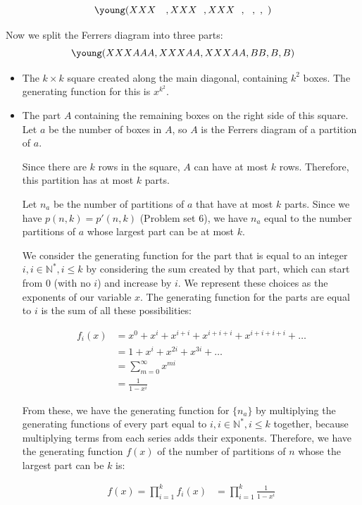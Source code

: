 \documentclass[10pt]{article}
\begin{document}
\begin{enumerate}
$$\young(XXX~~~,XXX~~,XXX~~,~~,~,~)$$

Now we split the Ferrers diagram into three parts:
$$\young(XXXAAA,XXXAA,XXXAA,BB,B,B)$$
\begin{itemize}
    \item The $k \times k$ square created along the main diagonal, containing $k^2$ boxes. The generating function for this is $x^{k^2}$.
    
    \item The part $A$ containing the remaining boxes on the right side of this square. Let $a$ be the number of boxes in $A$, so $A$ is the Ferrers diagram of a partition of $a$.
    
    Since there are $k$ rows in the square, $A$ can have at most $k$ rows. Therefore, this partition has at most $k$ parts.

    Let $n_a$ be the number of partitions of $a$ that have at most $k$ parts. Since we have $p(n,k)=p'(n,k)$ (Problem set 6), we have $n_a$ equal to the number partitions of $a$ whose largest part can be at most $k$.

     We consider the generating function for the part that is equal to an integer $i, i \in \mathbb{N}^*, i \leq k$ by considering the sum created by that part, which can start from $0$ (with no $i$) and increase by $i$. We represent these choices as the exponents of our variable $x$. The generating function for the parts are equal to $i$ is the sum of all these possibilities:

    \begin{align*}
        f_{i}(x) &= x^0+x^{i} +x^{i + i} + x^{i+i+i}+x^{i+i+i+i} + \ldots\\
        &=1+ x^{i} + x^{2i} + x^{3i} + \ldots\\
        &= \sum\limits_{m=0}^\infty x^{mi}\\
        &= \frac{1}{1-x^i}
    \end{align*}

    From these, we have the generating function for $\{n_a\}$ by multiplying the generating functions of every part equal to $i, i \in \mathbb{N}^*, i \leq k$ together, because multiplying terms from each series adds their exponents. Therefore, we have the generating function $f(x)$ of the number of partitions of $n$ whose the largest part can be $k$ is:  
    
    \begin{align*}
        f(x) = \prod\limits^{k}_{i=1} f_{i}(x)&= \prod\limits^{k}_{i=1} \frac{1}{1-x^{i}}
    \end{align*}
    

\end{itemize}
\end{enumerate}
\end{document}
